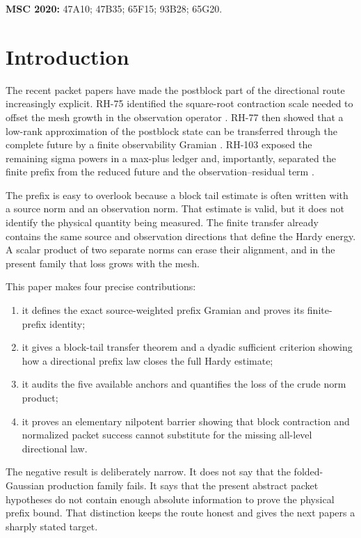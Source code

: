 \documentclass[11pt]{article}
\theoremstyle{definition}
\theoremstyle{remark}
\begin{document}
\medskip
\noindent\textbf{MSC 2020:} 47A10; 47B35; 65F15; 93B28; 65G20.

\section{Introduction}

The recent packet papers have made the postblock part of the directional
route increasingly explicit.  RH-75 identified the square-root contraction
scale needed to offset the mesh growth in the observation operator
\citep{WangBlockLaw2026}.  RH-77 then showed that a low-rank approximation of
the postblock state can be transferred through the complete future by a
finite observability Gramian \citep{WangEffectiveRank2026}.  RH-103 exposed the
remaining sigma powers in a max-plus ledger and, importantly, separated the
finite prefix from the reduced future and the observation--residual term
\citep{WangPowerLedger2026}.

The prefix is easy to overlook because a block tail estimate is often written
with a source norm and an observation norm.  That estimate is valid, but it
does not identify the physical quantity being measured.  The finite transfer
already contains the same source and observation directions that define the
Hardy energy.  A scalar product of two separate norms can erase their
alignment, and in the present family that loss grows with the mesh.

This paper makes four precise contributions:
\begin{enumerate}[leftmargin=2.2em]
 \item it defines the exact source-weighted prefix Gramian and proves its
       finite-prefix identity;
 \item it gives a block-tail transfer theorem and a dyadic sufficient
       criterion showing how a directional prefix law closes the full Hardy
       estimate;
 \item it audits the five available anchors and quantifies the loss of the
       crude norm product;
 \item it proves an elementary nilpotent barrier showing that block
       contraction and normalized packet success cannot substitute for the
       missing all-level directional law.
\end{enumerate}

The negative result is deliberately narrow.  It does not say that the
folded-Gaussian production family fails.  It says that the present abstract
packet hypotheses do not contain enough absolute information to prove the
physical prefix bound.  That distinction keeps the route honest and gives the
next papers a sharply stated target.
\end{document}
